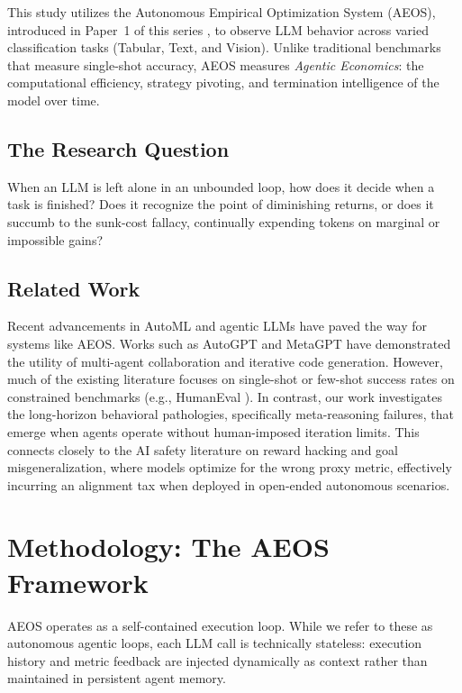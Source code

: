 \documentclass[11pt]{article}
\begin{document}
This study utilizes the Autonomous Empirical Optimization System (AEOS), introduced in Paper~1 of this series \citep{jajoo2026aitl}, to observe LLM behavior across varied classification tasks (Tabular, Text, and Vision). Unlike traditional benchmarks that measure single-shot accuracy, AEOS measures \emph{Agentic Economics}: the computational efficiency, strategy pivoting, and termination intelligence of the model over time.

\subsection{The Research Question}

When an LLM is left alone in an unbounded loop, how does it decide when a task is finished? Does it recognize the point of diminishing returns, or does it succumb to the sunk-cost fallacy, continually expending tokens on marginal or impossible gains?

\subsection{Related Work}

Recent advancements in AutoML and agentic LLMs have paved the way for systems like AEOS. Works such as AutoGPT \citep{richards2023autogpt} and MetaGPT \citep{hong2023metagpt} have demonstrated the utility of multi-agent collaboration and iterative code generation. However, much of the existing literature focuses on single-shot or few-shot success rates on constrained benchmarks (e.g., HumanEval \citep{chen2021evaluating}). In contrast, our work investigates the long-horizon behavioral pathologies, specifically meta-reasoning failures, that emerge when agents operate without human-imposed iteration limits. This connects closely to the AI safety literature on reward hacking and goal misgeneralization, where models optimize for the wrong proxy metric, effectively incurring an alignment tax when deployed in open-ended autonomous scenarios.

\section{Methodology: The AEOS Framework}
\label{sec:methodology}

AEOS operates as a self-contained execution loop. While we refer to these as autonomous agentic loops, each LLM call is technically stateless: execution history and metric feedback are injected dynamically as context rather than maintained in persistent agent memory.
\end{document}

